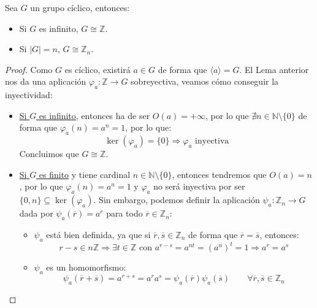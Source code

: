 \begin{teo}\label{teo:grupos_ciclicos}
    Sea $G$ un grupo cíclico, entonces:
    \begin{itemize}
        \item Si $G$ es infinito, $G\cong \mathbb{Z}$.
        \item Si $|G| = n$, $G\cong \mathbb{Z}_n$.
    \end{itemize}
    \begin{proof}
        Como $G$ es cíclico, existirá $a\in G$ de forma que $\langle a \rangle = G$. El Lema anterior nos da una aplicación $\varphi_a:\mathbb{Z}\to G$ sobreyectiva, veamos cómo conseguir la inyectividad:
        \begin{itemize}
            \item \underline{Si $G$ es infinito}, entonces ha de ser $O(a)=+\infty$, por lo que $\nexists n\in \mathbb{N}\setminus\{0\}$ de forma que $\varphi_a(n) = a^n = 1$, por lo que:
                \begin{equation*}
                    \ker(\varphi_a) = \{0\} \Longrightarrow \varphi_a \text{\ inyectiva}
                \end{equation*}
                Concluimos que $G\cong \mathbb{Z}$.
            \item \underline{Si $G$ es finito} y tiene cardinal $n\in \mathbb{N}\setminus\{0\}$, entonces tendremos que $O(a) = n$, por lo que $\varphi_a(n) = a^n = 1$ y $\varphi_a$ no será inyectiva por ser $\{0,n\}\subseteq \ker(\varphi_a)$. Sin embargo, podemos definir la aplicación $\psi_a:\mathbb{Z}_n\to G$ dada por $\psi_a(\overline{r}) = a^r$ para todo $\overline{r}\in \mathbb{Z}_n$:
                \begin{itemize}
                    \item $\psi_a$ está bien definida, ya que si $\overline{r},\overline{s}\in \mathbb{Z}_n$ de forma que $\overline{r}=\overline{s}$, entonces:
                        \begin{equation*}
                            r-s\in n\mathbb{Z} \Longrightarrow \exists t\in \mathbb{Z} \text{\ con\ }  a^{r-s} = a^{nt} = {(a^n)}^{t} = 1 \Longrightarrow a^r = a^s
                        \end{equation*}
                    \item $\psi_a$ es un homomorfismo:
                        \begin{equation*}
                            \psi_a(\overline{r}+\overline{s}) = a^{r+s} = a^r a^s = \psi_a(\overline{r})\psi_a(\overline{s}) \qquad \forall \overline{r},\overline{s}\in \mathbb{Z}_n

\end{equation*}
\end{itemize}
\end{itemize}
\end{proof}
\end{teo}
